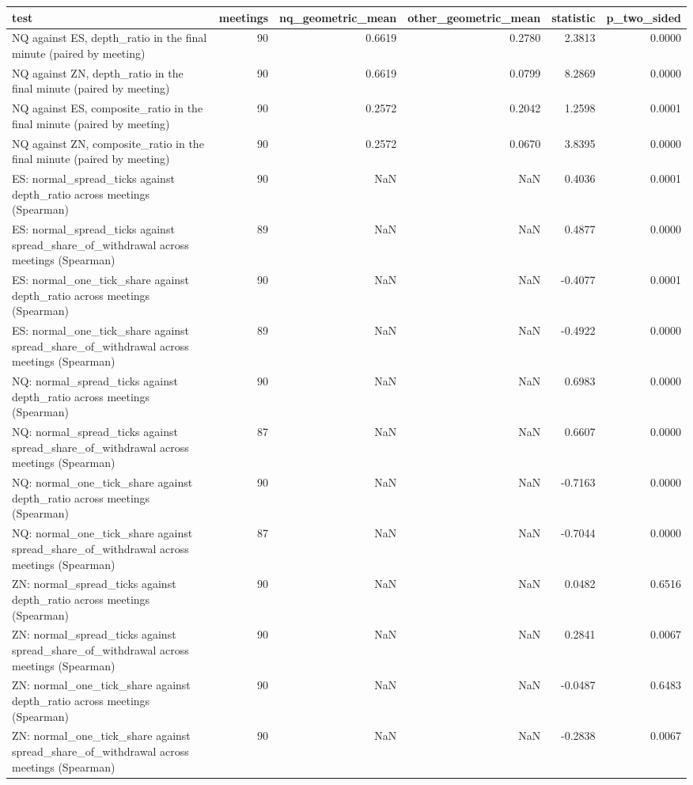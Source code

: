 \begin{tabular}{lrrrrr}
\toprule
test & meetings & nq_geometric_mean & other_geometric_mean & statistic & p_two_sided \\
\midrule
NQ against ES, depth_ratio in the final minute (paired by meeting) & 90 & 0.6619 & 0.2780 & 2.3813 & 0.0000 \\
NQ against ZN, depth_ratio in the final minute (paired by meeting) & 90 & 0.6619 & 0.0799 & 8.2869 & 0.0000 \\
NQ against ES, composite_ratio in the final minute (paired by meeting) & 90 & 0.2572 & 0.2042 & 1.2598 & 0.0001 \\
NQ against ZN, composite_ratio in the final minute (paired by meeting) & 90 & 0.2572 & 0.0670 & 3.8395 & 0.0000 \\
ES: normal_spread_ticks against depth_ratio across meetings (Spearman) & 90 & NaN & NaN & 0.4036 & 0.0001 \\
ES: normal_spread_ticks against spread_share_of_withdrawal across meetings (Spearman) & 89 & NaN & NaN & 0.4877 & 0.0000 \\
ES: normal_one_tick_share against depth_ratio across meetings (Spearman) & 90 & NaN & NaN & -0.4077 & 0.0001 \\
ES: normal_one_tick_share against spread_share_of_withdrawal across meetings (Spearman) & 89 & NaN & NaN & -0.4922 & 0.0000 \\
NQ: normal_spread_ticks against depth_ratio across meetings (Spearman) & 90 & NaN & NaN & 0.6983 & 0.0000 \\
NQ: normal_spread_ticks against spread_share_of_withdrawal across meetings (Spearman) & 87 & NaN & NaN & 0.6607 & 0.0000 \\
NQ: normal_one_tick_share against depth_ratio across meetings (Spearman) & 90 & NaN & NaN & -0.7163 & 0.0000 \\
NQ: normal_one_tick_share against spread_share_of_withdrawal across meetings (Spearman) & 87 & NaN & NaN & -0.7044 & 0.0000 \\
ZN: normal_spread_ticks against depth_ratio across meetings (Spearman) & 90 & NaN & NaN & 0.0482 & 0.6516 \\
ZN: normal_spread_ticks against spread_share_of_withdrawal across meetings (Spearman) & 90 & NaN & NaN & 0.2841 & 0.0067 \\
ZN: normal_one_tick_share against depth_ratio across meetings (Spearman) & 90 & NaN & NaN & -0.0487 & 0.6483 \\
ZN: normal_one_tick_share against spread_share_of_withdrawal across meetings (Spearman) & 90 & NaN & NaN & -0.2838 & 0.0067 \\
\bottomrule
\end{tabular}
